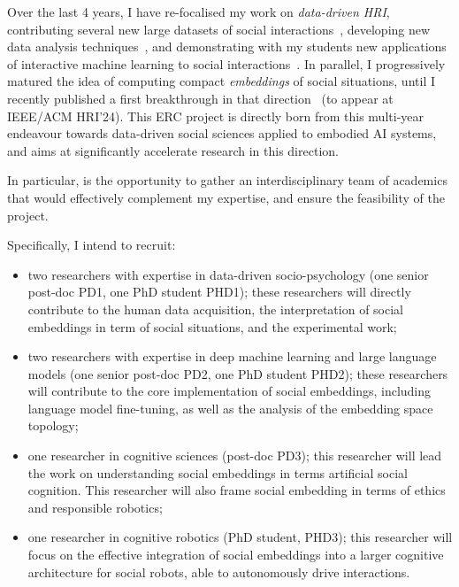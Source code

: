 Over the last 4 years, I have re-focalised my work on \emph{data-driven HRI},
contributing several new large datasets of social
interactions~\cite{lemaignan2018pinsoro,sallami2020unexpected,webb2023sogrin},
developing new data analysis
techniques~\cite{bartlett2019what,webb2022measuring}, and demonstrating with my
students new applications of interactive machine learning to social
interactions~\cite{senft2016sparc,winkle2020couch,winkle2021leador}.  In
parallel, I progressively matured the idea of computing compact
\emph{embeddings} of social situations, until I recently published a first
breakthrough in that direction~\cite{lemaignan2024social} (to appear at IEEE/ACM
HRI'24). This ERC project is directly born from this multi-year endeavour
towards data-driven social sciences applied to embodied AI systems, and aims at
significantly accelerate research in this direction.

In particular, \project is the opportunity to gather an interdisciplinary team
of academics that would effectively complement my expertise, and ensure the
feasibility of the project.

Specifically, I intend to recruit:

\begin{itemize}

    \item  two researchers with expertise in data-driven
        socio-psychology (one senior post-doc PD1, one PhD student PHD1); these
        researchers will directly contribute to the human data acquisition,
        the interpretation of social embeddings in term of social situations,
        and the experimental work;

    \item two researchers with expertise in deep machine learning and large
        language models (one senior post-doc PD2, one PhD student PHD2); these
        researchers will contribute to the core implementation of social
        embeddings, including language model fine-tuning, as well as the
        analysis of the embedding space topology;

    \item one researcher in cognitive sciences (post-doc PD3); this researcher
        will lead the work on understanding social embeddings in terms
        artificial social cognition. This researcher will also frame social
        embedding in terms of ethics and responsible robotics;

    \item one researcher in cognitive robotics (PhD student, PHD3); this
        researcher will focus on the effective integration of social
        embeddings into a larger cognitive architecture for social robots, able
        to autonomously drive interactions.
\end{itemize}

